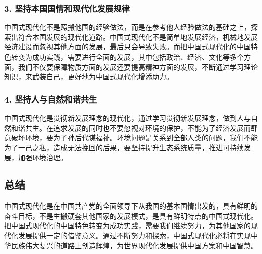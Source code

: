 \documentclass[12pt]{article}
\begin{document}
\subsubsection*{3. 坚持本国国情和现代化发展规律}

中国式现代化不是照搬他国的经验做法，而是在参考他人经验做法的基础之上，探索出符合本国发展的现代化道路。中国式现代化不是简单地发展经济，机械地发展经济建设而忽视其他方面的发展，最后只会导致失败。而把中国式现代化的中国特色转变为成功实践，需要进行全面的发展，其中包括政治、经济、文化等多个方面，我们不仅要保障物质方面的发展还要提高精神方面的发展，不断通过学习理论知识，来武装自己，更好地为中国式现代化增添助力。

\subsubsection*{4. 坚持人与自然和谐共生}

中国式现代化是贯彻新发展理念的现代化，通过学习贯彻新发展理念，做到人与自然和谐共生。在追求发展的同时也不要忽视对环境的保护，不能为了经济发展而肆意破坏环境，要为子孙后代谋福祉。环境问题是关系到全部人类的问题，我们不能为了一己之私，造成无法挽回的后果，要坚持提升生态系统质量，推进可持续发展，加强环境治理。

\subsection*{总结}

中国式现代化是在中国共产党的全面领导下从我国的基本国情出发的，具有鲜明的奋斗目标，不是生搬硬套其他国家的发展模式，是具有鲜明特点的中国式现代化。把中国式现代化的中国特色转变为成功实践，需要我们继续努力，为其他国家的现代化发展提供一定的借鉴意义。通过不断努力和探索，中国式现代化必将在实现中华民族伟大复兴的道路上创造辉煌，为世界现代化发展提供中国方案和中国智慧。
\end{document}

